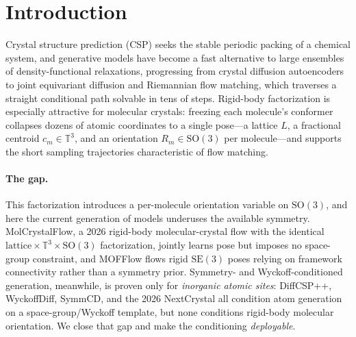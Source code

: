 \documentclass[journal=acsodf,manuscript=article]{achemso}
\begin{document}
\section{Introduction}
Crystal structure prediction (CSP) seeks the stable periodic packing of a chemical
system, and generative models have become a fast alternative to large ensembles of
density-functional relaxations, progressing from crystal diffusion
autoencoders\cite{xie2022cdvae} to joint equivariant
diffusion\cite{jiao2023diffcsp} and Riemannian flow
matching\cite{miller2024flowmm,lipman2023flowmatching,chen2024riemannian}, which
traverses a straight conditional path solvable in tens of steps. Rigid-body
factorization is especially attractive for molecular crystals: freezing each
molecule's conformer collapses dozens of atomic coordinates to a single pose---a
lattice $L$, a fractional centroid $c_m\in\mathbb{T}^3$, and an orientation
$R_m\in\mathrm{SO}(3)$ per molecule---and supports the short sampling trajectories
characteristic of flow matching.

\paragraph{The gap.} This factorization introduces a per-molecule orientation variable on
$\mathrm{SO}(3)$, and here the current generation of models underuses the available symmetry. MolCrystalFlow\cite{zeng2026molcrystalflow}, a 2026 rigid-body
molecular-crystal flow with the identical
$\text{lattice}\times\mathbb{T}^3\times\mathrm{SO}(3)$ factorization, jointly
learns pose but imposes no space-group constraint, and
MOFFlow\cite{kim2025mofflow} flows rigid $\mathrm{SE}(3)$ poses relying on
framework connectivity rather than a symmetry prior. Symmetry- and
Wyckoff-conditioned generation, meanwhile, is proven only for \emph{inorganic
atomic sites}: DiffCSP++\cite{jiao2024diffcsppp},
WyckoffDiff\cite{wyckoffdiff2025}, SymmCD\cite{symmcd2025}, and the 2026
NextCrystal\cite{mu2026nextcrystal} all condition atom generation on a
space-group/Wyckoff template, but none conditions rigid-body molecular
orientation. We close that gap and make the conditioning \emph{deployable}.
\end{document}
